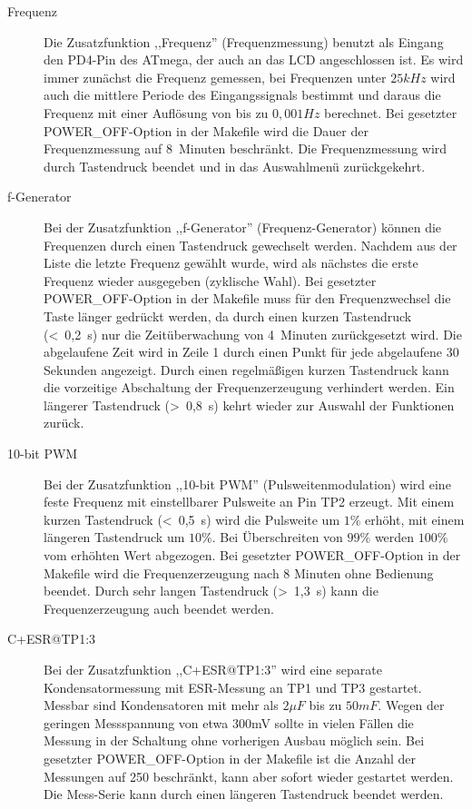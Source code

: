 \begin{description}
 \item[Frequenz]
Die Zusatzfunktion ,,Frequenz'' (Frequenzmessung) benutzt als Eingang den PD4-Pin des ATmega, der auch an das LCD angeschlossen ist.
Es wird immer zunächst die Frequenz gemessen, bei Frequenzen unter \(25 kHz\) wird auch die mittlere Periode des Eingangssignals
bestimmt und daraus die Frequenz mit einer Auflösung von bis zu \(0,001 Hz\) berechnet.
Bei gesetzter POWER\_OFF-Option in der Makefile wird die Dauer der Frequenzmessung auf 8~Minuten beschränkt.
Die Frequenzmessung wird durch Tastendruck beendet und in das Auswahlmenü zurückgekehrt.\\

 \item[f-Generator]
Bei der Zusatzfunktion ,,f-Generator'' (Frequenz-Generator) können die Frequenzen durch einen Tastendruck 
 gewechselt werden.
Nachdem aus der Liste die letzte Frequenz gewählt wurde, wird als nächstes die erste Frequenz
 wieder ausgegeben (zyklische Wahl).
Bei gesetzter POWER\_OFF-Option in der Makefile muss für den Frequenzwechsel die Taste länger gedrückt werden, da
durch einen kurzen Tastendruck (\textless~0,2~s) nur die Zeitüberwachung von 4~Minuten zurückgesetzt wird.
Die abgelaufene Zeit wird in Zeile 1 durch einen Punkt für jede abgelaufene 30 Sekunden angezeigt.
Durch einen regelmäßigen kurzen Tastendruck kann die vorzeitige Abschaltung der Frequenzerzeugung verhindert werden.
Ein längerer Tastendruck (\textgreater~0,8~s) kehrt wieder zur Auswahl der Funktionen zurück.\\

 \item[10-bit PWM]
Bei der Zusatzfunktion ,,10-bit PWM'' (Pulsweitenmodulation) wird eine feste Frequenz mit einstellbarer Pulsweite an Pin TP2 erzeugt.
Mit einem kurzen Tastendruck (\textless~0,5~s) wird die Pulsweite um \(1 \%\) erhöht, mit einem längeren Tastendruck um \(10 \%\).
Bei Überschreiten von \(99 \%\) werden \(100 \%\) vom erhöhten Wert abgezogen.
Bei gesetzter POWER\_OFF-Option in der Makefile wird die Frequenzerzeugung nach 8 Minuten ohne Bedienung beendet.
Durch sehr langen Tastendruck (\textgreater~1,3~s) kann die Frequenzerzeugung auch beendet werden.\\

 \item[C+ESR@TP1:3]
Bei der Zusatzfunktion ,,C+ESR@TP1:3'' wird eine separate Kondensatormessung mit ESR-Messung an TP1 und TP3 gestartet.
Messbar sind Kondensatoren mit mehr als \(2 \mu F\) bis zu \(50 mF\). Wegen der geringen Messspannung von etwa 300mV sollte
in vielen Fällen die Messung in der Schaltung ohne vorherigen Ausbau möglich sein.
Bei gesetzter POWER\_OFF-Option in der Makefile ist die Anzahl der Messungen auf 250 beschränkt,
kann aber sofort wieder gestartet werden.
Die Mess-Serie kann durch einen längeren Tastendruck beendet werden.\\


\end{description}

